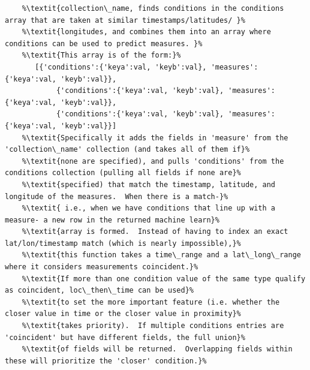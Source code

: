 \begin{lstlisting}[style=codedef]
	%\textit{Creates and returns a machine learning useful array.  In summary, it takes the values from the}% 
	%\textit{collection\_name, finds conditions in the conditions array that are taken at similar timestamps/latitudes/ }% 	
	%\textit{longitudes, and combines them into an array where conditions can be used to predict measures. }%
	%\textit{This array is of the form:}%
	   [{'conditions':{'keya':val, 'keyb':val}, 'measures':{'keya':val, 'keyb':val}},
            {'conditions':{'keya':val, 'keyb':val}, 'measures':{'keya':val, 'keyb':val}},
            {'conditions':{'keya':val, 'keyb':val}, 'measures':{'keya':val, 'keyb':val}}]  
	%\textit{Specifically it adds the fields in 'measure' from the 'collection\_name' collection (and takes all of them if}%
	%\textit{none are specified), and pulls 'conditions' from the conditions collection (pulling all fields if none are}%
 	%\textit{specified) that match the timestamp, latitude, and longitude of the measures.  When there is a match-}%
	%\textit{ i.e., when we have conditions that line up with a measure- a new row in the returned machine learn}%
	%\textit{array is formed.  Instead of having to index an exact lat/lon/timestamp match (which is nearly impossible),}% 
	%\textit{this function takes a time\_range and a lat\_long\_range where it considers measurements coincident.}%
  	%\textit{If more than one condition value of the same type qualify as coincident, loc\_then\_time can be used}%
	%\textit{to set the more important feature (i.e. whether the closer value in time or the closer value in proximity}%
	%\textit{takes priority).  If multiple conditions entries are 'coincident' but have different fields, the full union}%
	%\textit{of fields will be returned.  Overlapping fields within these will prioritize the 'closer' condition.}% 


\end{lstlisting}
